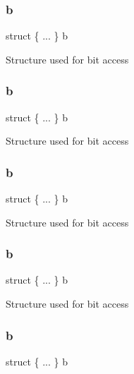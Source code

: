 \subsubsection{\texorpdfstring{b}{b}\hspace{0.1cm}{\footnotesize\ttfamily [2/6]}}
{\footnotesize\ttfamily struct \{ ... \}   b}

Structure used for bit access \mbox{\label{unionx_p_s_r___type_a682f18413750081b9bad663eef27b2e0}} 
\subsubsection{\texorpdfstring{b}{b}\hspace{0.1cm}{\footnotesize\ttfamily [3/6]}}
{\footnotesize\ttfamily struct \{ ... \}   b}

Structure used for bit access \mbox{\label{unionx_p_s_r___type_a5fe7b3d4251f5516a5cc744f416a600a}} 
\subsubsection{\texorpdfstring{b}{b}\hspace{0.1cm}{\footnotesize\ttfamily [4/6]}}
{\footnotesize\ttfamily struct \{ ... \}   b}

Structure used for bit access \mbox{\label{unionx_p_s_r___type_ac2a9a795ab2663b586a1a69f90b3354d}} 
\subsubsection{\texorpdfstring{b}{b}\hspace{0.1cm}{\footnotesize\ttfamily [5/6]}}
{\footnotesize\ttfamily struct \{ ... \}   b}

Structure used for bit access \mbox{\label{unionx_p_s_r___type_a979a7d3a363140b150617a8c5a295e76}} 
\subsubsection{\texorpdfstring{b}{b}\hspace{0.1cm}{\footnotesize\ttfamily [6/6]}}
{\footnotesize\ttfamily struct \{ ... \}   b}

